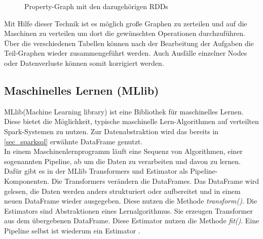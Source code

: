 \begin{figure}[h]
  \centering
  \caption{Property-Graph mit den dazugehörigen RDDs \cite{SPGRAPHX}}\label{fig:spark_graphx}
\end{figure}

\noindent
Mit Hilfe dieser Technik ist es möglich große Graphen zu zerteilen und auf die Maschinen zu verteilen um dort die gewünschten Operationen durchzuführen. Über die verschiedenen Tabellen können nach der Bearbeitung der Aufgaben die Teil-Graphen wieder zusammengeführt werden. Auch Ausfälle einzelner Nodes oder Datenverluste können somit korrigiert werden. \\



\newpage
\subsection{Maschinelles Lernen (MLlib)}\label{sec_sparkmlib}

MLlib(Machine Learning library) ist eine Bibliothek für maschinelles Lernen. Diese bietet die Möglichkeit, typische maschinelle Lern-Algorithmen auf verteilten Spark-Systemen zu nutzen. Zur Datenabstraktion wird das bereits in \ref{sec_sparksql} erwähnte DataFrame genutzt.  \\

\noindent
In einem Maschinenlernprogramm läuft eine Sequenz von Algorithmen, einer sogenannten Pipeline, ab um die Daten zu verarbeiten und davon zu lernen. 
Dafür gibt es in der MLlib Transformers und Estimator als Pipeline-Komponenten. 
Die Transformers verändern die DataFrames. Das DataFrame wird gelesen, die Daten werden anders strukturiert oder aufbereitet und in einem neuen DataFrame wieder ausgegeben. Diese nutzen die Methode \textsl{transform()}. 
Die Estimators sind Abstraktionen eines Lernalgorithmus. Sie erzeugen Transformer aus dem übergebenen DataFrame. Diese Estimator nutzen die Methode \textsl{fit()}.
Eine Pipeline selbst ist wiederum ein Estimator \cite{AAWS15}.\\

